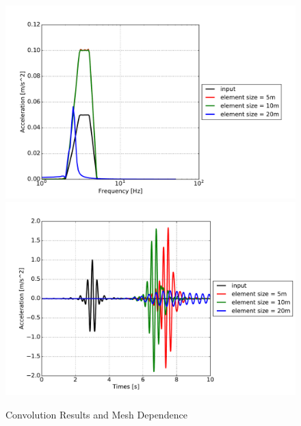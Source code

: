 \begin{figure}[H]
  \centering
  \includegraphics[width = 12cm]{./Figure-files/Day2/Convolution_Motions/top_acc_feq_all.pdf}
  \includegraphics[width = 12cm]{./Figure-files/Day2/Convolution_Motions/top_acc_time_all.pdf}
  \caption{Convolution Results and Mesh Dependence}
  \label{fig_day2_convolution_time_freq}
\end{figure}



































